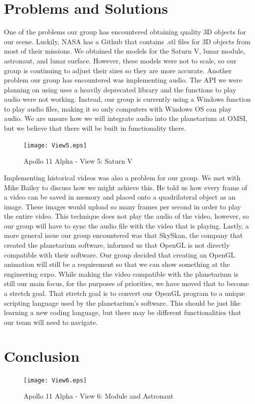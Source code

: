 \documentclass[onecolumn, draftclsnofoot,10pt, compsoc]{IEEEtran}
\begin{document}
\section{Problems and Solutions}

One of the problems our group has encountered obtaining quality 3D objects for our scene. Luckily, NASA has a Github that contains .stl files for 3D objects from most of their missions. We obtained the models for the Saturn V, lunar module, astronaut, and lunar surface. However, these models were not to scale, so our group is continuing to adjust their sizes so they are more accurate. Another problem our group has encountered was implementing audio. The API we were planning on using uses a heavily deprecated library and the functions to play audio were not working. Instead, our group is currently using a Windows function to play audio files, making it so only computers with Windows OS can play audio. We are unsure how we will integrate audio into the planetarium at OMSI, but we believe that there will be built in functionality there. 

\begin{figure}
    \texttt{[image: View5.eps]}
    \caption{Apollo 11 Alpha - View 5: Saturn V}
    \label{fig:View 5}
\end{figure}

Implementing historical videos was also a problem for our group. We met with Mike Bailey to discuss how we might achieve this. He told us how every frame of a video can be saved in memory and placed onto a quadrilateral object as an image. These images would upload so many frames per second in order to play the entire video. This technique does not play the audio of the video, however, so our group will have to sync the audio file with the video that is playing. Lastly, a more general issue our group encountered was that SkySkan, the company that created the planetarium software, informed us that OpenGL is not directly compatible with their software. Our group decided that creating an OpenGL animation will still be a requirement so that we can show something at the engineering expo. While making the video compatible with the planetarium is still our main focus, for the purposes of priorities, we have moved that to become a stretch goal. That stretch goal is to convert our OpenGL program to a unique scripting language used by the planetarium's software. This should be just like learning a new coding language, but there may be different functionalities that our team will need to navigate. 


\section{Conclusion}

\begin{figure}
    \texttt{[image: View6.eps]}
    \caption{Apollo 11 Alpha - View 6: Module and Astronaut}
    \label{fig:View 6}
\end{figure}
\end{document}
